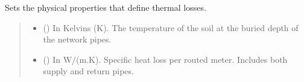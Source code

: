 \documentclass[letterpaper,10pt,english]{sphinxmanual}
\begin{document}
\begin{fulllineitems}
\begin{fulllineitems}
\label{\detokenize{generated/tamos.network.ThermalNetwork:tamos.network.ThermalNetwork.set_soil_properties}}
\pysigstartsignatures
{}
\pysigstopsignatures
\sphinxAtStartPar
Sets the physical properties that define thermal losses.
\begin{quote}\begin{description}
\begin{itemize}
\item {} 
\sphinxAtStartPar
{} (\sphinxstyleliteralemphasis{\sphinxupquote{, }}) \textendash{} In Kelvins (K).
The temperature of the soil at the buried depth of the network pipes.

\item {} 
\sphinxAtStartPar
{} (\sphinxstyleliteralemphasis{\sphinxupquote{, }}) \textendash{} In W/(m.K).
Specific heat loss per routed meter. Includes both supply  and return pipes.


\end{itemize}
\end{description}
\end{quote}
\end{fulllineitems}
\end{fulllineitems}
\end{document}
